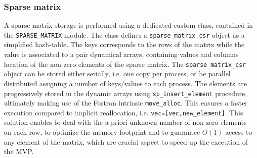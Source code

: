 \documentclass[edipack2.tex]{subfiles}
\begin{document}
\subsubsection{Sparse matrix}\label{CodeSparseMatrix}
A sparse matrix storage is performed using a
dedicated custom class, contained in the \texttt{SPARSE\_MATRIX} module. 
The class defines a \texttt{sparse\_matrix\_csr} object as a 
simplified hash-table. The keys corresponds to the rows of the matrix
while the value is associated to a pair dynamical arrays, containing values and
columns location of the non-zero elements of the sparse matrix.
The \texttt{sparse\_matrix\_csr} object can be stored either serially,
i.e. one copy per process, or be parallel distributed assigning a number of keys/values to each
process.
The elements are progressively stored in the dynamic arrays using
\texttt{sp\_insert\_element} procedure, ultimately making use of the Fortran intrinsic
\texttt{move\_alloc}.
This ensures a faster execution compared to implicit  
reallocation, i.e. \texttt{vec=[vec,new\_element]}.
This solution enables to deal with the a priori unknown number of
non-zero elements on each row, to optimize the memory footprint and
to guarantee $O(1)$ access  to any element of the matrix, which are
crucial aspect to speed-up the execution of the MVP. 
\end{document}
